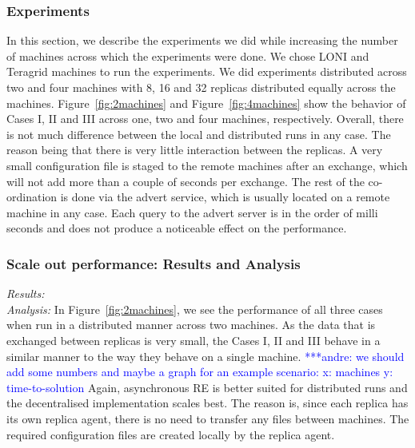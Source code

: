\documentclass{rspublic}
\newcommand{\alnote}[1]{ {\textcolor{blue} { ***andre: #1 }}}
\newcommand{\alnote}[1]{}
\begin{document}
\subsubsection{Experiments}
In this section, we describe the experiments we did while increasing the number of machines across which the experiments were done. We chose LONI and Teragrid machines to run the experiments. We did experiments distributed across two and four machines with 8, 16 and 32 replicas distributed equally across the machines. 
Figure~\ref{fig:2machines} and Figure~\ref{fig:4machines} show the behavior of Cases I, II and III across one, two and four machines, respectively. Overall, there is not much difference between the local and distributed runs in any case. The reason being that there is very little interaction between the replicas. A very small configuration file is staged to the remote machines after an exchange, which will not add more than a couple of seconds per exchange. The rest of the co-ordination is done via the advert service, which is usually located on a remote machine in any case. Each query to the advert server is in the order of milli seconds and does not produce a noticeable effect on the performance. 

\subsubsection{Scale out performance: Results and Analysis}

{\it Results:}\\


{\it Analysis: } In Figure~\ref{fig:2machines}, we see the performance of all three cases when run in a distributed manner across two machines. As the data that is exchanged between replicas is very small, the Cases I, II and III behave in a similar manner to the way they behave on a single machine. \alnote{we should add some numbers and maybe a graph for an example scenario: x: machines y: time-to-solution} Again, asynchronous RE is better suited for distributed runs and the decentralised implementation scales best. The reason is, since each replica has its own replica agent, there is no need to transfer any files between machines. The required configuration files are created locally by the replica agent.
\end{document}
